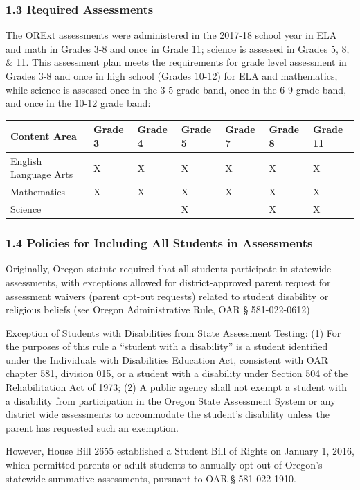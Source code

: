 \documentclass[]{article}
\begin{document}
\subsubsection{1.3 Required Assessments}\label{required-assessments}

The ORExt assessments were administered in the 2017-18 school year in
ELA and math in Grades 3-8 and once in Grade 11; science is assessed in
Grades 5, 8, \& 11. This assessment plan meets the requirements for
grade level assessment in Grades 3-8 and once in high school (Grades
10-12) for ELA and mathematics, while science is assessed once in the
3-5 grade band, once in the 6-9 grade band, and once in the 10-12 grade
band:

\begin{longtable}[]{@{}lllllll@{}}
\toprule
\textbf{Content Area} & \textbf{Grade 3} & \textbf{Grade 4} &
\textbf{Grade 5} & \textbf{Grade 7} & \textbf{Grade 8} & \textbf{Grade
11}\tabularnewline
\midrule
\endhead
English Language Arts & X & X & X & X & X & X\tabularnewline
Mathematics & X & X & X & X & X & X\tabularnewline
Science & & & X & & X & X\tabularnewline
\bottomrule
\end{longtable}

\subsubsection{1.4 Policies for Including All Students in
Assessments}\label{policies-for-including-all-students-in-assessments}

Originally, Oregon statute required that all students participate in
statewide assessments, with exceptions allowed for district-approved
parent request for assessment waivers (parent opt-out requests) related
to student disability or religious beliefs (see Oregon Administrative
Rule, OAR § 581-022-0612)

Exception of Students with Disabilities from State Assessment Testing:
(1) For the purposes of this rule a ``student with a disability'' is a
student identified under the Individuals with Disabilities Education
Act, consistent with OAR chapter 581, division 015, or a student with a
disability under Section 504 of the Rehabilitation Act of 1973; (2) A
public agency shall not exempt a student with a disability from
participation in the Oregon State Assessment System or any district wide
assessments to accommodate the student's disability unless the parent
has requested such an exemption.

However, House Bill 2655 established a Student Bill of Rights on January
1, 2016, which permitted parents or adult students to annually opt-out
of Oregon's statewide summative assessments, pursuant to OAR §
581-022-1910.
\end{document}

